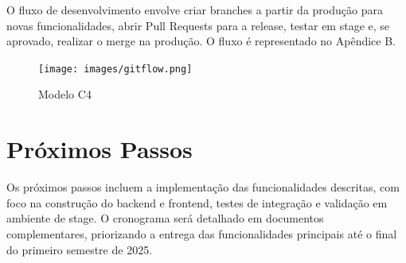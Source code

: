 \documentclass[12pt, a4paper]{article}
\begin{document}
\begin{spacing}{1.5}
\begin{spacing}{1.5}
O fluxo de desenvolvimento envolve criar branches a partir da produção para novas funcionalidades, abrir Pull Requests para a release, testar em stage e, se aprovado, realizar o merge na produção. O fluxo é representado no Apêndice B.

\begin{figure}[H]
    \centering
    \texttt{[image: images/gitflow.png]}
    \caption{Modelo C4}
    \label{fig:C4}
\end{figure}
\end{spacing}

\section{Próximos Passos}
\begin{spacing}{1.5}
Os próximos passos incluem a implementação das funcionalidades descritas, com foco na construção do backend e frontend, testes de integração e validação em ambiente de stage. O cronograma será detalhado em documentos complementares, priorizando a entrega das funcionalidades principais até o final do primeiro semestre de 2025.
\end{spacing}


\end{spacing}
\end{document}
